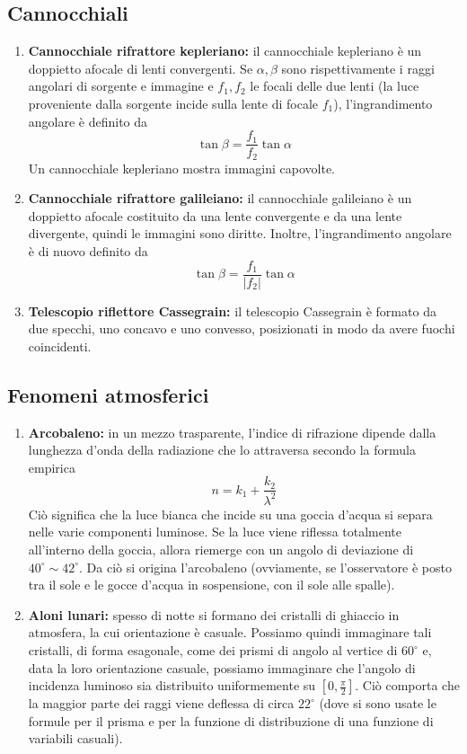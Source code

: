 \documentclass[a4paper,11pt]{article}
\begin{document}
\subsection{Cannocchiali}
\begin{enumerate}[resume]
	\item\textbf{Cannocchiale rifrattore kepleriano:} il cannocchiale kepleriano è un doppietto afocale di lenti convergenti. Se $\alpha,\beta$ sono rispettivamente i raggi angolari di sorgente e immagine e $f_1,f_2$ le focali delle due lenti (la luce proveniente dalla sorgente incide sulla lente di focale $f_1$), l'ingrandimento angolare è definito da
	\[\tan\beta=\frac{f_1}{f_2}\tan\alpha\]
	Un cannocchiale kepleriano mostra immagini capovolte.
	\item \textbf{Cannocchiale rifrattore galileiano:} il cannocchiale galileiano è un doppietto afocale costituito da una lente convergente e da una lente divergente, quindi le immagini sono diritte. Inoltre, l'ingrandimento angolare è di nuovo definito da
	\[\tan\beta=\frac{f_1}{|f_2|}\tan\alpha\]
	\item\textbf{Telescopio riflettore Cassegrain:} il telescopio Cassegrain è formato da due specchi, uno concavo e uno convesso, posizionati in modo da avere fuochi coincidenti.
\end{enumerate}
\subsection{Fenomeni atmosferici}
\begin{enumerate}[resume]
	\item \textbf{Arcobaleno:} in un mezzo trasparente, l'indice di rifrazione dipende dalla lunghezza d'onda della radiazione che lo attraversa secondo la formula empirica
	\[n=k_1+\frac{k_2}{\lambda^2}\]
	Ciò significa che la luce bianca che incide su una goccia d'acqua si separa nelle varie componenti luminose. Se la luce viene riflessa totalmente all'interno della goccia, allora riemerge con un angolo di deviazione di $40^\circ\sim42^\circ$. Da ciò si origina l'arcobaleno (ovviamente, se l'osservatore è posto tra il sole e le gocce d'acqua in sospensione, con il sole alle spalle).
	\item\textbf{Aloni lunari:} spesso di notte si formano dei cristalli di ghiaccio in atmosfera, la cui orientazione è casuale. Possiamo quindi immaginare tali cristalli, di forma esagonale, come dei prismi di angolo al vertice di $60^\circ$ e, data la loro orientazione casuale, possiamo immaginare che l'angolo di incidenza luminoso sia distribuito uniformemente su $[0,\frac{\pi}{2}]$. Ciò comporta che la maggior parte dei raggi viene deflessa di circa $22^\circ$ (dove si sono usate le formule per il prisma e per la funzione di distribuzione di una funzione di variabili casuali).
	
\end{enumerate}
\end{document}
